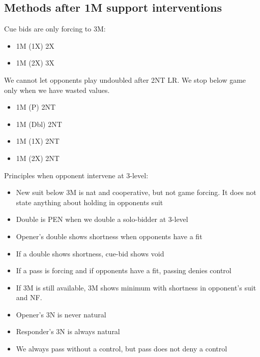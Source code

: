 \documentclass{article}
\renewcommand{\sp}{\ensuremath\spadesuit}
\newcommand{\he}{\ensuremath\heartsuit}
\newcommand{\nt}{\relsize{-1}NT\relsize{1}}
\begin{document}
\subsection{Methods after 1M support interventions}

Cue bids are only forcing to 3M:
\begin{itemize}
	\itemsep0em
	\item 1M (1X) 2X
	\item 1M (2X) 3X
\end{itemize}

We cannot let opponents play undoubled after 2\nt{} LR. We stop below game only when we have wasted values.
\begin{itemize}
	\itemsep0em
	\item 1M (P) 2\nt{}
	\item 1M (Dbl) 2\nt{}
	\item 1M (1X) 2\nt{}
	\item 1M (2X) 2\nt{}
\end{itemize}

Principles when opponent intervene at 3-level:
\begin{itemize}
	\itemsep0em
	\item New suit below 3M is nat and cooperative, but not game forcing. It does not state anything about holding in opponents suit
	\item Double is PEN when we double a solo-bidder at 3-level
	\item Opener's double shows shortness when opponents have a fit
	\item If a double shows shortness, cue-bid shows void
	\item If a pass is forcing and if opponents have a fit, passing denies control
	\item If 3M is still available, 3M shows minimum with shortness in opponent's suit and NF.
	\item Opener's 3N is never natural
	\item Responder's 3N is always natural
	\item We always pass without a control, but pass does not deny a control
\end{itemize}

\end{document}
